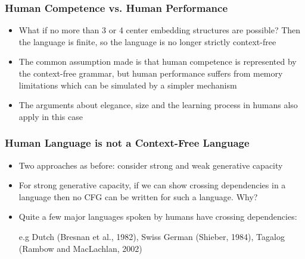 \documentclass[compress,color=usenames]{beamer}
\begin{document}
\begin{frame}
\frametitle{Human Competence vs. Human Performance}

\begin{itemize}
\item What if no more than 3 or 4 center embedding structures are possible?
Then the language is finite, so the language is no longer strictly
context-free

\item The common assumption made is that human competence is
represented by the context-free grammar, but human performance suffers
from memory limitations which can be simulated by a simpler mechanism

\item The arguments about elegance, size and the learning process in humans
also apply in this case
\end{itemize}

\end{frame}

\begin{frame}
\frametitle{Human Language is not a Context-Free Language}

\begin{itemize}
\item Two approaches as before: consider strong and weak generative
capacity

\item For strong generative capacity, if we can show crossing dependencies in
a language then no CFG can be written for such a language. Why?

\item Quite a few major languages spoken by humans have crossing
dependencies:


e.g Dutch (Bresnan et al., 1982), Swiss German (Shieber, 1984), Tagalog
(Rambow and MacLachlan, 2002)
\end{itemize}

\end{frame}
\end{document}
